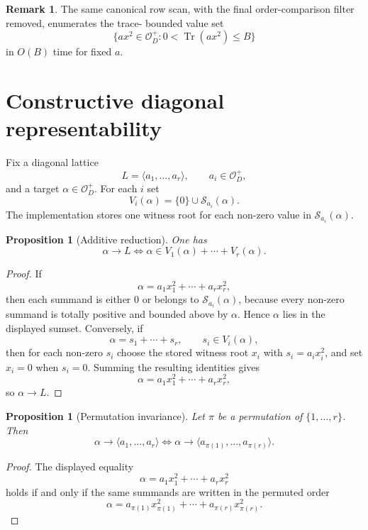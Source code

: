 \documentclass[manuscript]{acmart}
\theoremstyle{plain}
\newtheorem{proposition}[theorem]{Proposition}
\theoremstyle{definition}
\theoremstyle{nonitalicremark}
\newtheorem{remark}[theorem]{Remark}
\newcommand{\OO}{\mathcal{O}}
\newcommand{\OD}{\OO_D}
\newcommand{\Tr}{\operatorname{Tr}}
\newcommand{\cS}{\mathcal{S}}
\begin{document}
\begin{remark}\label{rem:trace-bounded-variant}
The same canonical row scan, with the final order-comparison filter removed, enumerates the trace-
bounded value set
\[
\{a x^2\in\OD^+ : 0<\Tr(a x^2)\le B\}
\]
in $O(B)$ time for fixed $a$.
\end{remark}

\section{Constructive diagonal representability}\label{sec:repr}

Fix a diagonal lattice
\[
L=\langle a_1,\dots,a_r\rangle,
\qquad a_i\in\OD^+,
\]
and a target $\alpha\in\OD^+$. For each $i$ set
\[
V_i(\alpha)=\{0\}\cup\cS_{a_i}(\alpha).
\]
The implementation stores one witness root for each non-zero value in $\cS_{a_i}(\alpha)$.

\begin{proposition}[Additive reduction]\label{prop:additive-reduction}
One has
\[
\alpha\to L
\iff
\alpha\in V_1(\alpha)+\cdots+V_r(\alpha).
\]
\end{proposition}

\begin{proof}
If
\[
\alpha=a_1x_1^2+\cdots+a_rx_r^2,
\]
then each summand is either $0$ or belongs to $\cS_{a_i}(\alpha)$, because every non-zero summand is
totally positive and bounded above by $\alpha$. Hence $\alpha$ lies in the displayed sumset.
Conversely, if
\[
\alpha=s_1+\cdots+s_r,
\qquad s_i\in V_i(\alpha),
\]
then for each non-zero $s_i$ choose the stored witness root $x_i$ with $s_i=a_i x_i^2$, and set
$x_i=0$ when $s_i=0$. Summing the resulting identities gives
\[
\alpha=a_1x_1^2+\cdots+a_rx_r^2,
\]
so $\alpha\to L$.
\end{proof}

\begin{proposition}[Permutation invariance]\label{prop:perm}
Let $\pi$ be a permutation of $\{1,\dots,r\}$. Then
\[
\alpha\to \langle a_1,\dots,a_r\rangle
\iff
\alpha\to \langle a_{\pi(1)},\dots,a_{\pi(r)}\rangle.
\]
\end{proposition}

\begin{proof}
The displayed equality
\[
\alpha=a_1x_1^2+\cdots+a_rx_r^2
\]
holds if and only if the same summands are written in the permuted order
\[
\alpha=a_{\pi(1)}x_{\pi(1)}^2+\cdots+a_{\pi(r)}x_{\pi(r)}^2.
\]
\end{proof}
\end{document}

